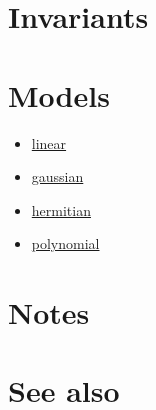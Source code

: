 \documentclass{article}
\begin{document}
\section*{Invariants}

\section*{Models}

\begin{itemize}
\item \href{research/kml/documentation/linear.html}{linear}
\item \href{research/kml/documentation/gaussian.html}{gaussian}
\item \href{research/kml/documentation/hermitian.html}{hermitian}
\item \href{research/kml/documentation/polynomial.html}{polynomial}
\end{itemize}

\section*{Notes}


\section*{See also}




\end{document}
